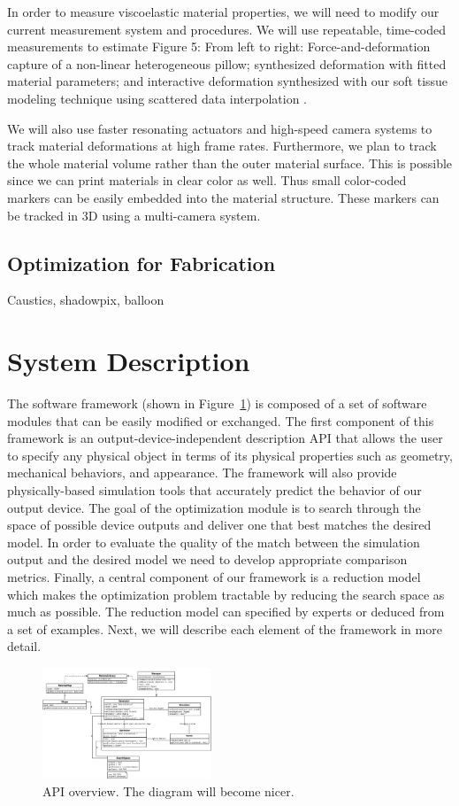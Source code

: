 \documentclass[annual]{acmsiggraph}
\begin{document}
In order to measure viscoelastic material properties, we will need to modify our current measurement
system and procedures. We will use repeatable, time-coded measurements to estimate
Figure 5: From left to right: Force-and-deformation capture of a non-linear heterogeneous pillow;
synthesized deformation with fitted material parameters; and interactive deformation synthesized
with our soft tissue modeling technique using scattered data interpolation \cite{Bickel:2010}.

We will also use faster resonating actuators and high-speed
camera systems to track material deformations at high frame rates. Furthermore, we plan to track
the whole material volume rather than the outer material surface. This is possible since we can
print materials in clear color as well. Thus small color-coded markers can be easily embedded into
the material structure. These markers can be tracked in 3D using a multi-camera system.
\subsection{Optimization for Fabrication}
Caustics, shadowpix, balloon
\section{System Description}
The software framework (shown in Figure~\ref{fig:framework}) is composed of 
a set of software
modules that can be easily modified or exchanged. The first component
of this framework is an output-device-independent description API
that allows the user to specify any physical object in terms of its physical
properties such as geometry, mechanical behaviors, and appearance. 
The framework will also provide physically-based
simulation tools that accurately predict the behavior of our output device.
The goal of the optimization module is to search through
the space of possible device outputs and deliver one that best matches the
desired model. In order to evaluate the quality of the match between the
simulation output and the desired model we need to develop appropriate
comparison metrics. Finally, a central component of our framework is
a reduction model which makes the optimization problem tractable by
reducing the search space as much as possible.
The reduction model can specified by experts or deduced from a
set of examples. Next, we will describe each element of the framework in
more detail.
\begin{figure}
\includegraphics[width=0.45\textwidth]{figure/framework.pdf}
\caption{API overview. The diagram will become nicer.}
\label{fig:framework}
\end{figure}
\end{document}
